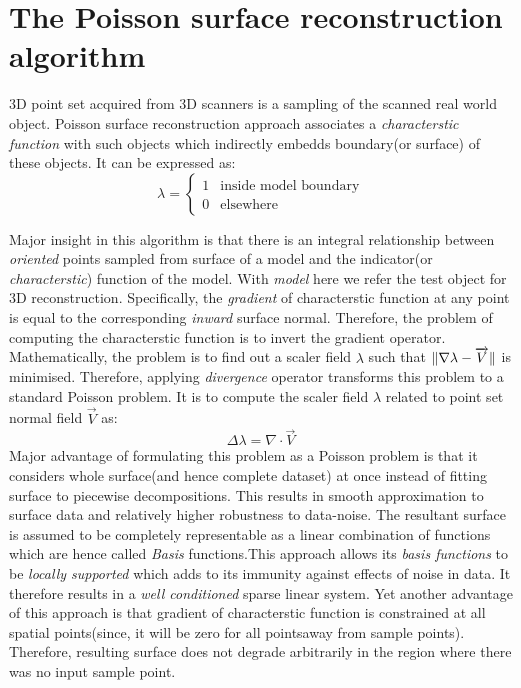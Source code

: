 \documentclass{article}
\begin{document}
\section{The Poisson surface reconstruction algorithm}
3D point set acquired from 3D scanners is a sampling of the scanned real world object. Poisson surface reconstruction approach associates a \textit{characterstic function} with such objects which indirectly embedds boundary(or surface) of these objects. It can be expressed as:
\begin{equation}
\lambda=\begin{cases} 1 & \text{inside model boundary}\\
                      0 & \text{elsewhere}
         \end{cases}
\end{equation}

Major insight in this algorithm is that there is an integral relationship between \textit{oriented} points sampled from surface of a model and the indicator(or \textit{characterstic}) function of the model. With \textit{model} here we refer the test object for 3D reconstruction. Specifically, the \textit{gradient} of characterstic function at any point is equal to the corresponding \textit{inward} surface normal. Therefore, the problem of computing the characterstic function is to invert the gradient operator. Mathematically, the problem is to find out a scaler field $\lambda$ such that $\Arrowvert\nabla\lambda-\overrightarrow{V}\Arrowvert$ is minimised. \newline
Therefore, applying \textit{divergence} operator transforms this problem to a standard Poisson problem. It is to compute the scaler field $\lambda$ related to point set normal field $\overrightarrow{V}$ as:
\begin{equation}
\Delta\lambda=\nabla\cdot\overrightarrow{V}
\end{equation}
Major advantage of formulating this problem as a Poisson problem is that it considers whole surface(and hence complete dataset) at once instead of fitting surface to piecewise decompositions. This results in smooth approximation to surface data and relatively higher robustness to data-noise. The resultant surface is assumed to be completely representable as a linear combination of functions which are hence called \textit{Basis} functions.This approach allows its \textit{basis functions} to be \textit{locally supported} which adds to its immunity against effects of noise in data. It therefore results in a \textit{well conditioned} sparse linear system.\newline
Yet another advantage of this approach is that gradient of characterstic function is constrained at all spatial points(since, it will be zero for all pointsaway from sample points). Therefore, resulting surface does not degrade arbitrarily in the region where there was no input sample point.
\end{document}
